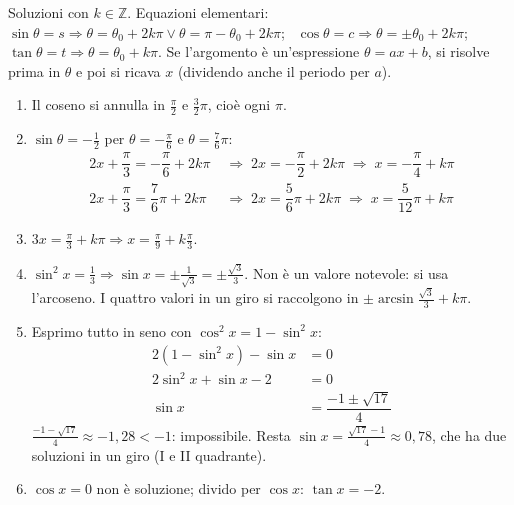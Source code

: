 \begin{question}[ID=4.5, subtitle={Equazioni goniometriche miste — serie 5}, tags={goniometria, equazioni goniometriche}, difficulty=media]
\begin{explanation}
Soluzioni con $k\in\mathbb{Z}$. Equazioni elementari: \ $\sin\theta=s \Rightarrow \theta=\theta_0+2k\pi \vee \theta=\pi-\theta_0+2k\pi$; \ $\cos\theta=c \Rightarrow \theta=\pm\theta_0+2k\pi$; \ $\tan\theta=t \Rightarrow \theta=\theta_0+k\pi$. Se l'argomento è un'espressione $\theta=ax+b$, si risolve prima in $\theta$ e poi si ricava $x$ (dividendo anche il periodo per $a$).
\begin{enumerate}
    \item Il coseno si annulla in $\tfrac\pi2$ e $\tfrac32\pi$, cioè ogni $\pi$.
    \item $\sin\theta=-\tfrac12$ per $\theta=-\tfrac\pi6$ e $\theta=\tfrac76\pi$:
    \[\begin{aligned}
    2x+\dfrac\pi3=-\dfrac\pi6+2k\pi &\;\Rightarrow\; 2x=-\dfrac\pi2+2k\pi \;\Rightarrow\; x=-\dfrac\pi4+k\pi\\
    2x+\dfrac\pi3=\dfrac76\pi+2k\pi &\;\Rightarrow\; 2x=\dfrac56\pi+2k\pi \;\Rightarrow\; x=\dfrac5{12}\pi+k\pi
    \end{aligned}\]
    \item $3x=\tfrac\pi3+k\pi \Rightarrow x=\tfrac\pi9+k\tfrac\pi3$.
    \item $\sin^2x=\tfrac13 \Rightarrow \sin x=\pm\tfrac{1}{\sqrt3}=\pm\tfrac{\sqrt3}{3}$. Non è un valore notevole: si usa l'arcoseno. I quattro valori in un giro si raccolgono in $\pm\arcsin\tfrac{\sqrt3}{3}+k\pi$.
    \item Esprimo tutto in seno con $\cos^2x=1-\sin^2x$:
    \[\begin{aligned}
    2(1-\sin^2x)-\sin x &= 0\\
    2\sin^2x+\sin x-2 &= 0\\
    \sin x &= \dfrac{-1\pm\sqrt{17}}{4}
    \end{aligned}\]
    $\tfrac{-1-\sqrt{17}}{4}\approx-1{,}28<-1$: impossibile. Resta $\sin x=\tfrac{\sqrt{17}-1}{4}\approx0{,}78$, che ha due soluzioni in un giro (I e II quadrante).
    \item $\cos x=0$ non è soluzione; divido per $\cos x$: $\tan x=-2$.
\end{enumerate}
\end{explanation}
\end{question}


